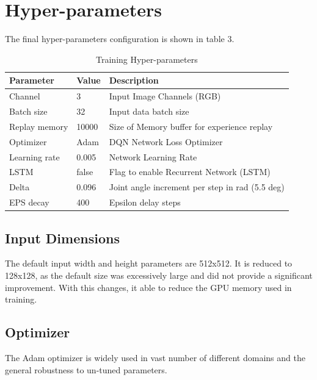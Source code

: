 \documentclass[10pt,journal,compsoc]{IEEEtran}
\begin{document}
\section{Hyper-parameters}
The final hyper-parameters configuration is shown in table 3. 

\begin{table}[h]
\caption{Training Hyper-parameters}
\begin{tabular}{|l|l|l|}
\hline
\textbf{Parameter} & \textbf{Value} & \textbf{Description}                                \\ \hline
Channel            & 3              & Input Image Channels (RGB)                          \\ \hline
Batch size         & 32             & Input data batch size                               \\ \hline
Replay memory      & 10000          & Size of Memory buffer for experience replay         \\ \hline
Optimizer          & Adam           & DQN Network Loss Optimizer                          \\ \hline
Learning rate      & 0.005          & Network Learning Rate                               \\ \hline
LSTM               & false          & Flag to enable Recurrent Network (LSTM)             \\ \hline
Delta              & 0.096          & Joint angle increment per step in rad (5.5 deg)     \\ \hline
EPS decay          & 400            & Epsilon delay steps                                 \\ \hline
\end{tabular}
\end{table}

\subsection{Input Dimensions}
The default input width and height parameters are 512x512. It is reduced to 128x128, as the default size was excessively large and did not provide a significant improvement. With this changes, it able to reduce the GPU memory used in training.

\subsection{Optimizer}
The Adam optimizer is widely used in vast number of different domains and the general robustness to un-tuned parameters. 
\end{document}

